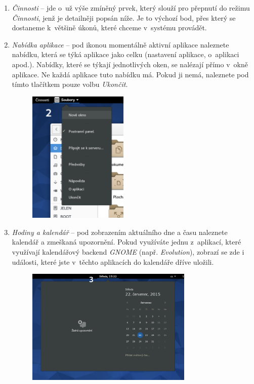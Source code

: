 \begin{enumerate}
\item\emph{Činnosti} -- jde o~už výše zmíněný prvek, který slouží pro přepnutí do režimu \emph{Činnosti}, jenž je detailněji popsán níže. Je to výchozí bod, přes který se dostaneme k~většině úkonů, které chceme v~systému provádět.

\item\emph{Nabídka aplikace} -- pod ikonou momentálně aktivní aplikace naleznete nabídku, která se týká aplikace jako celku (nastavení aplikace, o~aplikaci apod.). Nabídky, které se týkají jednotlivých oken, se nalézají přímo v~okně aplikace. Ne každá aplikace tuto nabídku má. Pokud ji nemá, naleznete pod tímto tlačítkem pouze volbu \emph{Ukončit}.

\begin{figure}[t]
\begin{center}
\includegraphics[width=0.45\textwidth]{img/menu-aplikace}
 \label{fig:menu-aplikace}
\end{center}
\end{figure}

\item\emph{Hodiny a kalendář} -- pod zobrazením aktuálního dne a času naleznete kalendář a zmeškaná upozornění. Pokud využíváte jednu z~aplikací, které využívají kalendářový backend \emph{GNOME} (např. \emph{Evolution}), zobrazí se zde i události, které jste v~těchto aplikacích do kalendáře dříve uložili.

\begin{figure}[p]
\begin{center}
\includegraphics[width=0.75\textwidth]{img/kalendar}
 \label{fig:kalendar}
\end{center}
\end{figure}


\end{enumerate}

